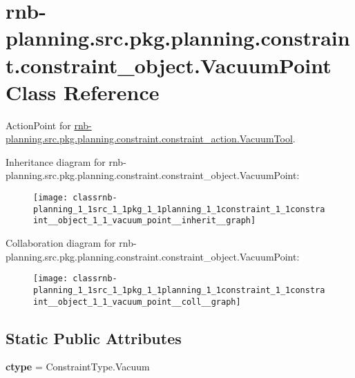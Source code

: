 \hypertarget{classrnb-planning_1_1src_1_1pkg_1_1planning_1_1constraint_1_1constraint__object_1_1_vacuum_point}{}\section{rnb-\/planning.src.\+pkg.\+planning.\+constraint.\+constraint\+\_\+object.\+Vacuum\+Point Class Reference}
\label{classrnb-planning_1_1src_1_1pkg_1_1planning_1_1constraint_1_1constraint__object_1_1_vacuum_point}


Action\+Point for \hyperlink{classrnb-planning_1_1src_1_1pkg_1_1planning_1_1constraint_1_1constraint__action_1_1_vacuum_tool}{rnb-\/planning.\+src.\+pkg.\+planning.\+constraint.\+constraint\+\_\+action.\+Vacuum\+Tool}.  




Inheritance diagram for rnb-\/planning.src.\+pkg.\+planning.\+constraint.\+constraint\+\_\+object.\+Vacuum\+Point\+:
\nopagebreak
\begin{figure}[H]
\begin{center}
\leavevmode
\texttt{[image: classrnb-planning\_1\_1src\_1\_1pkg\_1\_1planning\_1\_1constraint\_1\_1constraint\_\_object\_1\_1\_vacuum\_point\_\_inherit\_\_graph]}
\end{center}
\end{figure}


Collaboration diagram for rnb-\/planning.src.\+pkg.\+planning.\+constraint.\+constraint\+\_\+object.\+Vacuum\+Point\+:
\nopagebreak
\begin{figure}[H]
\begin{center}
\leavevmode
\texttt{[image: classrnb-planning\_1\_1src\_1\_1pkg\_1\_1planning\_1\_1constraint\_1\_1constraint\_\_object\_1\_1\_vacuum\_point\_\_coll\_\_graph]}
\end{center}
\end{figure}
\subsection*{Static Public Attributes}
\begin{DoxyCompactItemize}
\item 
\mbox{\label{classrnb-planning_1_1src_1_1pkg_1_1planning_1_1constraint_1_1constraint__object_1_1_vacuum_point_a1e5de0e638c0488177b11150fb0a3e0f}} 
{\bfseries ctype} = Constraint\+Type.\+Vacuum
\end{DoxyCompactItemize}
